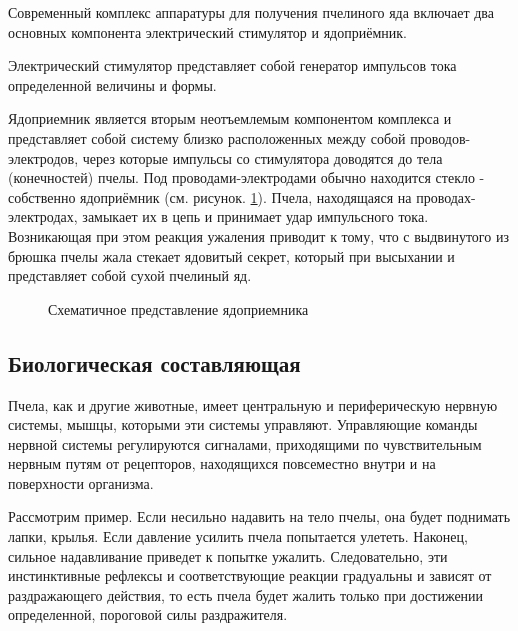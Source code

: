 Современный комплекс аппаратуры для получения пчелиного яда включает два основных компонента \longndash электрический стимулятор и ядоприёмник.

Электрический стимулятор представляет собой генератор импульсов тока определенной величины и формы.

Ядоприемник является вторым неотъемлемым компонентом комплекса и представляет собой систему близко расположенных между собой проводов-электродов, через которые импульсы со стимулятора доводятся до тела (конечностей) пчелы. Под проводами-электродами обычно находится стекло - собственно ядоприёмник (см. рисунок. \ref{img:poison_reciever}). Пчела, находящаяся на проводах-электродах, замыкает их в цепь и принимает удар импульсного тока. Возникающая при этом реакция ужаления приводит к тому, что с выдвинутого из брюшка пчелы жала стекает ядовитый секрет, который при высыхании и представляет собой сухой пчелиный яд.

\begin{figure}[h]
  
  \caption{Схематичное представление ядоприемника}
  \label{img:poison_reciever}
\end{figure}

\subsection*{Биологическая составляющая}

Пчела, как и другие животные, имеет центральную и периферическую нервную системы, мышцы, которыми эти системы управляют. Управляющие команды нервной системы регулируются сигналами, приходящими по чувствительным нервным путям от рецепторов, находящихся повсеместно \longndash внутри и на поверхности организма.

Рассмотрим пример. Если несильно надавить на тело пчелы, она будет поднимать лапки, крылья. Если давление усилить \longndash пчела попытается улететь. Наконец, сильное надавливание приведет к попытке ужалить. Следовательно, эти инстинктивные рефлексы и соответствующие реакции градуальны и зависят от раздражающего действия, то есть пчела будет жалить только при достижении определенной, пороговой силы раздражителя.

